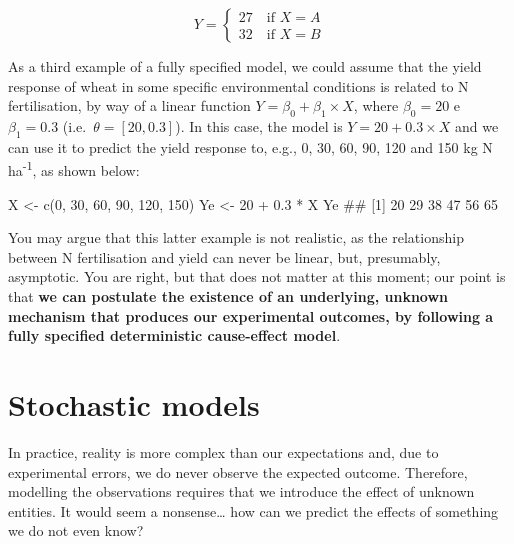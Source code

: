\documentclass[a4paper,12pt,oneside]{book}
\newenvironment{Shaded}{\begin{snugshade}}{\end{snugshade}}
\newcommand{\DecValTok}[1]{#1}
\newcommand{\FloatTok}[1]{#1}
\newcommand{\SpecialCharTok}[1]{#1}
\newcommand{\DocumentationTok}[1]{#1}
\newcommand{\OtherTok}[1]{#1}
\newcommand{\FunctionTok}[1]{#1}
\newcommand{\NormalTok}[1]{#1}
\begin{document}
\[
Y = \left\{ {\begin{array}{ll}
27 \quad \textrm{if} \,\, X = A \\
32 \quad \textrm{if} \,\, X = B
\end{array}} \right.
\]

As a third example of a fully specified model, we could assume that the yield response of wheat in some specific environmental conditions is related to N fertilisation, by way of a linear function \(Y = \beta_0 + \beta_1 \times X\), where \(\beta_0 = 20\) e \(\beta_1 = 0.3\) (i.e.~\(\theta = [20, 0.3]\)). In this case, the model is \(Y = 20 + 0.3 \times X\) and we can use it to predict the yield response to, e.g., 0, 30, 60, 90, 120 and 150 kg N ha\textsuperscript{-1}, as shown below:

\begin{Shaded}
\begin{Highlighting}[]
\NormalTok{X }\OtherTok{\textless{}{-}} \FunctionTok{c}\NormalTok{(}\DecValTok{0}\NormalTok{, }\DecValTok{30}\NormalTok{, }\DecValTok{60}\NormalTok{, }\DecValTok{90}\NormalTok{, }\DecValTok{120}\NormalTok{, }\DecValTok{150}\NormalTok{)}
\NormalTok{Ye }\OtherTok{\textless{}{-}} \DecValTok{20} \SpecialCharTok{+} \FloatTok{0.3} \SpecialCharTok{*}\NormalTok{ X}
\NormalTok{Ye}
\DocumentationTok{\#\# [1] 20 29 38 47 56 65}
\end{Highlighting}
\end{Shaded}

You may argue that this latter example is not realistic, as the relationship between N fertilisation and yield can never be linear, but, presumably, asymptotic. You are right, but that does not matter at this moment; our point is that \textbf{we can postulate the existence of an underlying, unknown mechanism that produces our experimental outcomes, by following a fully specified deterministic cause-effect model}.

\hypertarget{stochastic-models}{%
\section{Stochastic models}\label{stochastic-models}}

In practice, reality is more complex than our expectations and, due to experimental errors, we do never observe the expected outcome. Therefore, modelling the observations requires that we introduce the effect of unknown entities. It would seem a nonsense\ldots{} how can we predict the effects of something we do not even know?
\end{document}
